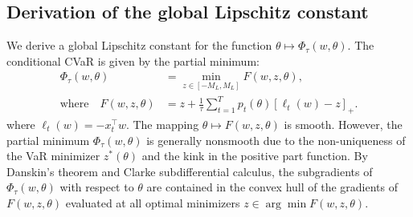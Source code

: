 \documentclass[smallextended]{svjour3}
\begin{document}
\subsection{Derivation of the global Lipschitz constant}\label{sec:lipschitz}

We derive a global Lipschitz constant for the function $\theta \mapsto \Phi_\tau(w, \theta)$. The conditional CVaR is given by the partial minimum:
\begin{equation}
\begin{split}
    \Phi_\tau(w, \theta) &= \min_{z \in [-M_L, M_L]} F(w, z, \theta),\\
    \text{where}\quad F(w, z, \theta) &= z + \frac{1}{\tau} \sum_{t=1}^T p_t(\theta) [\ell_t(w) - z]_+ .
\end{split}
\end{equation}
where $\ell_t(w) = -x_t^\top w$. The mapping $\theta \mapsto F(w, z, \theta)$ is smooth. However, the partial minimum $\Phi_\tau(w, \theta)$ is generally nonsmooth due to the non-uniqueness of the VaR minimizer $z^*(\theta)$ and the kink in the positive part function. By Danskin's theorem and Clarke subdifferential calculus, the subgradients of $\Phi_\tau(w, \theta)$ with respect to $\theta$ are contained in the convex hull of the gradients of $F(w, z, \theta)$ evaluated at all optimal minimizers $z \in \arg\min F(w, z, \theta)$.
\end{document}
